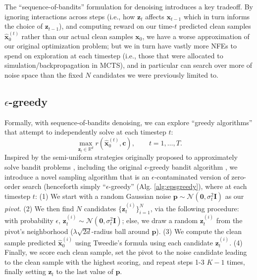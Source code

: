 \documentclass{article}
\newcommand{\x}{\mathbf{x}}
\begin{document}
The ``sequence-of-bandits'' formulation for denoising introduces a key tradeoff. By ignoring interactions across steps (i.e., how $\mathbf{z}_t$ affects $\x_{t-1}$ which in turn informs the choice of $\mathbf{z}_{t-1}$), and computing reward on our time-$t$ predicted clean samples $\hat{\x}_0^{(t)}$ rather than our actual clean samples $\x_0$, we have a worse approximation of our original optimization problem; but we in turn have vastly more NFEs to spend on exploration at each timestep (i.e., those that were allocated to simulation/backpropagation in MCTS), and in particular can search over more of noise space than the fixed $N$ candidates we were previously limited to.

\subsection{${\epsilon}$-greedy}

Formally, with sequence-of-bandits denoising, we can explore ``greedy algorithms'' that attempt to independently solve at each timestep $t$:
%
\begin{equation}
    \max_{\mathbf{z}_t \in \mathbb{R}^d} r(\hat{\x}_0^{(t)},\mathbf{c}), \quad \quad t=1,\ldots,T.
\end{equation}
%
Inspired by the semi-uniform strategies originally proposed to approximately solve bandit problems \citep{slivkins2024introductionmultiarmedbandits}, including the original $\epsilon$-greedy bandit algorithm \citep{sutton1998reinforcement}, we introduce a novel sampling algorithm that is an $\epsilon$-contaminated version of zero-order search (henceforth simply ``$\epsilon$-greedy'' (Alg. \autoref{alg:epsgreedy}), where at each timestep $t$: (1) We start with a random Gaussian noise $\mathbf{p} \sim \mathcal{N}(\mathbf{0},\sigma_t^2\mathbf{I})$ as our \textit{pivot}. (2) We then find $N$ candidates $\{\mathbf{z}_t^{(i)}\}_{i=1}^N$, via the following procedure: with probability $\epsilon$, $\mathbf{z}_t^{(i)} \sim \mathcal{N}(\mathbf{0},\sigma_t^2\mathbf{I})$; else, we draw a random $\mathbf{z}_t^{(i)}$ from the pivot’s neighborhood ($\lambda\sqrt{2d}$-radius ball around $\mathbf{p}$). (3) We compute the clean sample predicted $\hat{\x}_0^{(i)}$ using Tweedie's formula using each candidate $\mathbf{z}_t^{(i)}$. (4) Finally, we score each clean sample, set the pivot to the noise candidate leading to the clean sample with the highest scoring, and repeat steps 1-3 $K-1$ times, finally setting $\mathbf{z}_t$ to the last value of $\mathbf{p}$.
\end{document}
